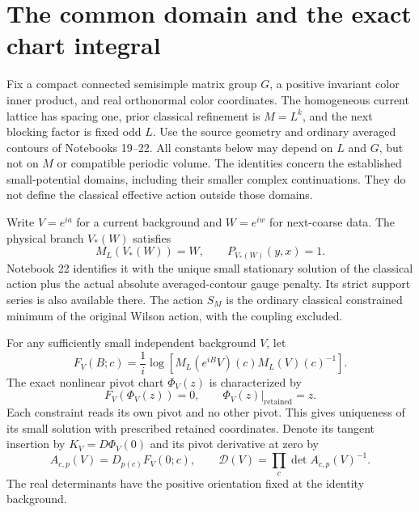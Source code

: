 \section{The common domain and the exact chart integral}
\label{gc-domain}

Fix a compact connected semisimple matrix group $G$, a positive
invariant color inner product, and real orthonormal color coordinates.
The homogeneous current lattice has spacing one, prior classical
refinement is $M=L^k$, and the next blocking factor is fixed odd $L$.
Use the source geometry and ordinary averaged contours of Notebooks
19--22. All constants below may depend on $L$ and $G$, but not on $M$
or compatible periodic volume. The identities concern the established
small-potential domains, including their smaller complex continuations.
They do not define the classical effective action outside those domains.

Write $V=e^{ia}$ for a current background and $W=e^{iw}$ for next-coarse
data. The physical branch $V_*(W)$ satisfies
\begin{equation}\label{gc-physical-branch}
 M_L(V_*(W))=W,\qquad P_{V_*(W)}(y,x)=1.
\end{equation}
Notebook 22 identifies it with the unique small stationary solution
of the classical action plus the actual absolute averaged-contour
gauge penalty. Its strict support series is also available there.
The action $S_M$ is the ordinary classical constrained minimum of
the original Wilson action, with the coupling excluded.

For any sufficiently small independent background $V$, let
\begin{equation}\label{gc-constraint}
 F_V(B;c)=\frac1i\log\!\left[
 M_L(e^{iB}V)(c)M_L(V)(c)^{-1}\right].
\end{equation}
The exact nonlinear pivot chart $\Phi_V(z)$ is characterized by
\begin{equation}\label{gc-chart}
 F_V(\Phi_V(z))=0,\qquad
 \Phi_V(z)|_{\mathrm{retained}}=z.
\end{equation}
Each constraint reads its own pivot and no other pivot. This gives
uniqueness of its small solution with prescribed retained coordinates.
Denote its tangent insertion by $K_V=D\Phi_V(0)$ and its pivot
derivative at zero by
\begin{equation}\label{gc-pivot}
 A_{c,p}(V)=D_{p(c)}F_V(0;c),\qquad
 \mathcal D(V)=\prod_c\det A_{c,p}(V)^{-1}.
\end{equation}
The real determinants have the positive orientation fixed at the
identity background.

